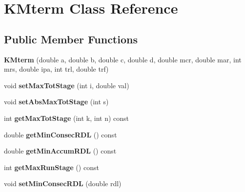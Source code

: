 \hypertarget{class_k_mterm}{
\section{KMterm Class Reference}
\label{class_k_mterm}
}
\subsection*{Public Member Functions}
\begin{DoxyCompactItemize}
\item 
\hypertarget{class_k_mterm_a228e731c6dba88785c4fb3d1ed8db367}{
{\bfseries KMterm} (double a, double b, double c, double d, double mcr, double mar, int mrs, double ipa, int trl, double trf)}
\label{class_k_mterm_a228e731c6dba88785c4fb3d1ed8db367}

\item 
\hypertarget{class_k_mterm_aeae2458189453d674030daff53a7046e}{
void {\bfseries setMaxTotStage} (int i, double val)}
\label{class_k_mterm_aeae2458189453d674030daff53a7046e}

\item 
\hypertarget{class_k_mterm_a43f4798cb5e73dc85b81ead95eafcd2e}{
void {\bfseries setAbsMaxTotStage} (int s)}
\label{class_k_mterm_a43f4798cb5e73dc85b81ead95eafcd2e}

\item 
\hypertarget{class_k_mterm_a66a170ccf8256ae8f2233a6a3e1dedbc}{
int {\bfseries getMaxTotStage} (int k, int n) const }
\label{class_k_mterm_a66a170ccf8256ae8f2233a6a3e1dedbc}

\item 
\hypertarget{class_k_mterm_a3bb373a030606d62b4fc45227a2d5c25}{
double {\bfseries getMinConsecRDL} () const }
\label{class_k_mterm_a3bb373a030606d62b4fc45227a2d5c25}

\item 
\hypertarget{class_k_mterm_a2bf50c9c0879819a10442d2c3f98cb6f}{
double {\bfseries getMinAccumRDL} () const }
\label{class_k_mterm_a2bf50c9c0879819a10442d2c3f98cb6f}

\item 
\hypertarget{class_k_mterm_ac13232869276bdc1554e2f1e61c95343}{
int {\bfseries getMaxRunStage} () const }
\label{class_k_mterm_ac13232869276bdc1554e2f1e61c95343}

\item 
\hypertarget{class_k_mterm_abeef9b87b15dc3d4d56ab47913d4b81b}{
void {\bfseries setMinConsecRDL} (double rdl)}
\label{class_k_mterm_abeef9b87b15dc3d4d56ab47913d4b81b}


\end{DoxyCompactItemize}
